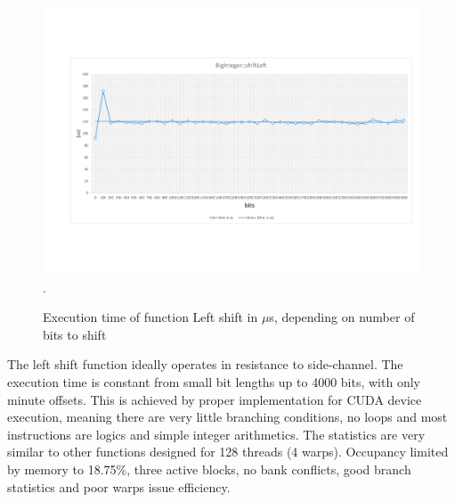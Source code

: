 \documentclass[oneside,openright,12pt,final,en]{mgr}
\begin{document}
\begin{figure}[H]
	\centering
	\includegraphics[width=\textwidth,trim={0.5cm 2.8cm 0.4cm 2.8cm},clip]{leftshift.pdf}.
	\caption{Execution time of function Left shift in $\mu$s, depending on number of bits to shift}
	\label{fig:leftshift}
\end{figure}

The left shift function ideally operates in resistance to side-channel. The execution time is constant from small bit lengths up to 4000 bits, with only minute offsets. This is achieved by proper implementation for CUDA device execution, meaning there are very little branching conditions, no loops and most instructions are logics and simple integer arithmetics. The statistics are very similar to other functions designed for 128 threads (4 warps). Occupancy limited by memory to 18.75\%, three active blocks, no bank conflicts, good branch statistics and poor warps issue efficiency.   
\end{document}
